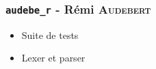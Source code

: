 \subsubsection{\texttt{audebe\_r} - Rémi \textsc{Audebert}}

\begin{itemize}
    \item Suite de tests
    \item Lexer et parser
\end{itemize}
